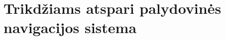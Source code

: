 \documentclass[../gnss_interference_resistant_thesis.tex]{subfiles}
\begin{document}
\section{Trikdžiams atspari palydovinės navigacijos sistema}







\end{document}
